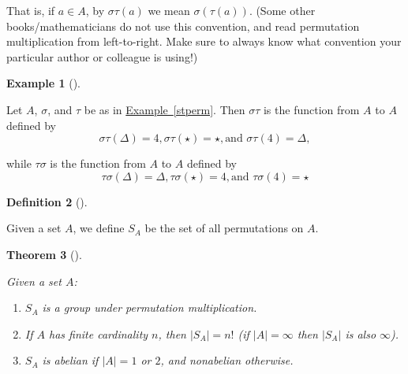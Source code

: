 \documentclass[10pt,]{book}
\theoremstyle{plain}
\newtheorem{theorem}{Theorem}[section]
\theoremstyle{definition}
\newtheorem{definition}[theorem]{Definition}
\theoremstyle{definition}
\theoremstyle{definition}
\newtheorem{example}[theorem]{Example}
\theoremstyle{definition}
\numberwithin{equation}{section}
\begin{document}
    That is, if \(a\in A\), by \(\sigma \tau(a)\) we mean \(\sigma(\tau(a))\). (Some other books/mathematicians do not use this convention, and read permutation multiplication from left-to-right.
    Make sure to always know what convention your particular author or colleague is using!)
\begin{example}[]\label{example-51}

        Let \(A\), \(\sigma\), and \(\tau\) be as in \hyperref[stperm]{Example~\ref{stperm}}.
        Then \(\sigma \tau\) is the function from \(A\) to \(A\) defined by
\begin{equation*}

          \sigma \tau(\Delta)=4,  \sigma \tau(\star)=\star,  \text{and }  \sigma \tau(4)=\Delta,
        
\end{equation*}

        while \(\tau \sigma\) is
        the function from \(A\) to \(A\) defined by
\begin{equation*}

          \tau \sigma (\Delta)=\Delta,  \tau \sigma (\star)=4,  \text{and }  \tau \sigma(4)=\star
        
\end{equation*}

\end{example}
\begin{definition}[{}]\label{definition-42}

        Given a set \(A\), we define \(S_A\) be the set of all
        permutations on \(A\).
\label{notation-55}
\end{definition}
\begin{theorem}[{}]\label{sym}

        Given a set \(A\):
        \leavevmode%
\begin{enumerate}
\item\hypertarget{li-321}{}
              \(S_A\) is a group under permutation multiplication.
\item\hypertarget{li-322}{}
              If \(A\) has finite cardinality \(n\), then \(|S_A|=n!\) (if \(|A|=\infty\) then \(|S_A|\) is also \(\infty\)).
\item\hypertarget{li-323}{}
              \(S_A\) is abelian if \(|A|=1\) or \(2\), and nonabelian otherwise.
\end{enumerate}

\end{theorem}
\end{document}

